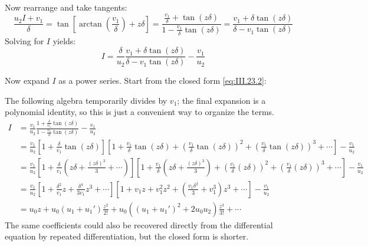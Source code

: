 Now rearrange and take tangents:
\begin{equation*}
    \frac{u_{2}I + v_{1}}{\delta} = \tan\left[\arctan\left(\frac{v_{1}}{\delta}\right) + z\delta\right]
        = \frac{\frac{v_{1}}{\delta} + \tan(z\delta)}{1 - \frac{v_{1}}{\delta}\tan(z\delta)}
        = \frac{v_{1} + \delta\tan(z\delta)}{\delta - v_{1}\tan(z\delta)}
\end{equation*}
Solving for $I$ yields:
\begin{equation} \label{eq:III.23.2}
    I = \frac{\delta}{u_{2}} \frac{v_{1} + \delta\tan(z\delta)}{\delta - v_{1}\tan(z\delta)} - \frac{v_{1}}{u_{2}}
\end{equation}

Now expand $I$ as a power series. Start from the closed form \eqref{eq:III.23.2}:

The following algebra temporarily divides by $v_1$; the final expansion is a polynomial identity,
so this is just a convenient way to organize the terms.
\begin{equation*}
    \begin{aligned}
        I
        &= \frac{v_{1}}{u_{2}} \frac{1 + \frac{\delta}{v_{1}}\tan(z\delta)}{1 - \frac{v_{1}}{\delta}\tan(z\delta)} - \frac{v_{1}}{u_{2}} \\
        &= \frac{v_{1}}{u_{2}}\left[1 + \frac{\delta}{v_{1}}\tan(z\delta)\right]
            \left[1 + \frac{v_{1}}{\delta}\tan(z\delta)
                + \left(\frac{v_{1}}{\delta}\tan(z\delta)\right)^{2}
                + \left(\frac{v_{1}}{\delta}\tan(z\delta)\right)^{3} + \cdots \right]
             - \frac{v_{1}}{u_{2}} \\
        &= \frac{v_{1}}{u_{2}}\left[1 + \frac{\delta}{v_{1}}\left(z\delta + \frac{(z\delta)^{3}}{3} + \cdots \right)\right]
            \left[1 + \frac{v_{1}}{\delta}\left(z\delta + \frac{(z\delta)^{3}}{3}\right)
                + \left(\frac{v_{1}}{\delta}(z\delta)\right)^{2}
                + \left(\frac{v_{1}}{\delta}(z\delta)\right)^{3} + \cdots \right] - \frac{v_{1}}{u_{2}} \\
        &= \frac{v_{1}}{u_{2}}\left[1 + \frac{\delta^{2}}{v_{1}}z + \frac{\delta^{4}}{3v_{1}}z^{3} + \cdots \right]
            \left[1 + v_{1}z + v_{1}^{2}z^{2} + \left(\frac{v_{1}\delta^{2}}{3} + v_{1}^{3}\right)z^{3} + \cdots \right] - \frac{v_{1}}{u_{2}} \\
        &= u_{0}z + u_{0}(u_{1} + u_{1}')\frac{z^{2}}{2!} + u_{0}((u_{1} + u_{1}')^{2} + 2u_{0}u_{2})\frac{z^{3}}{3!} + \cdots
    \end{aligned}
\end{equation*}
The same coefficients could also be recovered directly from the differential equation by repeated differentiation, but the closed form is shorter.

